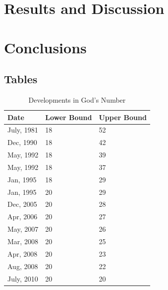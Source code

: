 \documentclass{report}
\newcommand{\tbo}[1]{\textbf{#1}}
\begin{document}
	
    \newpage
    \chapter{Results and Discussion}
    
    \newpage
    \chapter{Conclusions}
    
    \newpage
    \begin{appendices}
		\chapter{Tables}
	   	\begin{table}[H]
			\def\arraystretch{1.25}
			\centering
			\caption{Developments in God's Number}
			\label{tab:godsNumber}
			\begin{tabular}{M{0.16\textwidth}M{0.16\textwidth}M{0.16\textwidth}}
				\toprule
				\tbo{Date} & \tbo{Lower Bound} & \tbo{Upper Bound} \\
				\midrule
				July, 1981	&	18	&	52 \\
				Dec, 1990	&	18	&	42 \\
				May, 1992	&	18	&	39 \\
				May, 1992	&	18	&	37 \\
				Jan, 1995	&	18	&	29 \\
				Jan, 1995	&	20	&	29 \\
				Dec, 2005	&	20	&	28 \\
				Apr, 2006	&	20	&	27 \\
				May, 2007	&	20	&	26 \\
				Mar, 2008	&	20	&	25 \\
				Apr, 2008	&	20	&	23 \\
				Aug, 2008	&	20	&	22 \\
				July, 2010	&	20	&	20 \\
				\bottomrule
			\end{tabular}
		\end{table}
				

\end{appendices}
\end{document}
